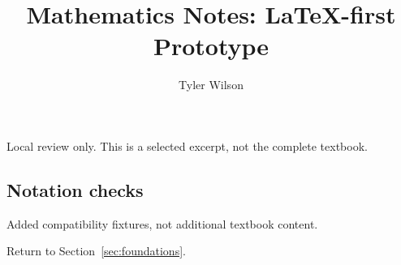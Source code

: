 \documentclass[11pt]{article}
\title{Mathematics Notes: LaTeX-first Prototype}
\author{Tyler Wilson}
\date{}
\theoremstyle{definition}
\begin{document}
\maketitle
Local review only. This is a selected excerpt, not the complete textbook.
\ifdefined\HCode
{}
\fi
\tableofcontents

\subsection{Notation checks}
Added compatibility fixtures, not additional textbook content.

Return to Section~\ref{sec:foundations}.
\end{document}
